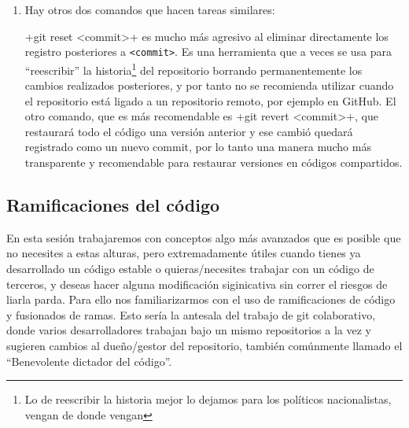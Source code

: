 \documentclass[a5paper, oneside,10pt]{article}
\begin{document}
\begin{enumerate}
    \item Hay otros dos comandos que hacen tareas similares:     
    
    \cverb+git reset <commit>+ es mucho más agresivo al eliminar directamente los registro posteriores a \verb+<commit>+. Es una herramienta que a veces se usa para ``reescribir'' la historia\footnote{Lo de reescribir la historia mejor lo dejamos para los políticos nacionalistas, vengan de donde vengan} del repositorio borrando permanentemente los cambios realizados posteriores, y por tanto no se recomienda utilizar cuando el repositorio está ligado a un repositorio remoto, por ejemplo en GitHub. El otro comando, que es más recomendable es \cverb+git revert <commit>+, que restaurará todo el código una versión anterior y ese cambió quedará registrado como un nuevo commit, por lo tanto una manera mucho más transparente y recomendable para restaurar versiones en códigos compartidos.
    
   \end{enumerate}
   
  \subsection{Ramificaciones del código}
    En esta sesión trabajaremos con conceptos algo más avanzados que es posible que no necesites a estas alturas, pero extremadamente útiles cuando tienes ya desarrollado un código estable o quieras/necesites trabajar con un código de terceros, y deseas hacer alguna modificación siginicativa sin correr el riesgos de liarla parda. Para ello nos familiarizarmos con el uso de ramificaciones de código y fusionados de ramas. Esto sería la antesala del trabajo de git colaborativo, donde varios desarrolladores trabajan bajo un mismo repositorios a la vez y sugieren cambios al dueño/gestor del repositorio, también comúnmente llamado el ``Benevolente dictador del código''.
    
\end{document}
